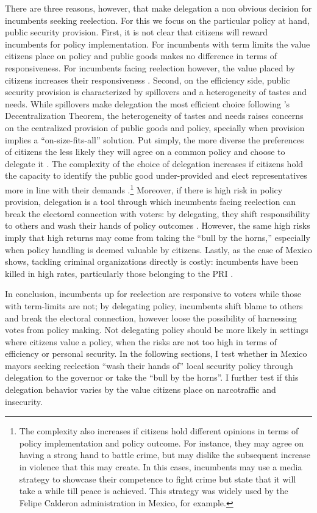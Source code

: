 \documentclass[12pt]{amsart}
\numberwithin{equation}{section}
\theoremstyle{definition}
\theoremstyle{definition}
\theoremstyle{definition}
\begin{document}
There are three reasons, however, that make delegation a non obvious decision for incumbents seeking reelection. For this we focus on the particular policy at hand, public security provision. First, it is not clear that citizens will reward incumbents for policy implementation. For incumbents with term limits the value citizens place on policy and public goods makes no difference in terms of responsiveness. For incumbents facing reelection however, the value placed by citizens increases their responsiveness \citep{lizzeri_2001, milner_2004}. Second, on the efficiency side, public security provision is characterized by spillovers and a heterogeneity of tastes and needs. While spillovers make delegation the most efficient choice following \citet{oates_1972}'s Decentralization Theorem, the heterogeneity of tastes and needs raises concerns on the centralized provision of public goods and policy, specially when provision implies a ``on-size-fits-all'' solution. Put simply, the more diverse the preferences of citizens the less likely they will agree on a common policy and choose to delegate it \citep{martin_2006, lyne_etal_2006}. The complexity of the choice of delegation increases if citizens hold the capacity to identify the public good under-provided and elect representatives more in line with their demands \citet{Besley_case_1995}.\footnote{The complexity also increases if citizens hold different opinions in terms of policy implementation and policy outcome. For instance, they may agree on having a strong hand to battle crime, but may dislike the subsequent increase in violence that this may create. In this cases, incumbents may use a media strategy to showcase their competence to fight crime but state that it will take a while till peace is achieved. This strategy was widely used by the Felipe Calderon administration in Mexico, for example.} Moreover, if there is high risk in policy provision, delegation is a tool through which incumbents facing reelection can break the electoral connection with voters: by delegating, they shift responsibility to others and wash their hands of policy outcomes \citep{fiorina_1982, loftis_2014}. However, the same high risks imply that high returns may come from taking the ``bull by the horns,'' especially when policy handling is deemed valuable by citizens. Lastly, as the case of Mexico shows, tackling criminal organizations directly is costly: incumbents have been killed in high rates, particularly those belonging to the PRI \citep{ley_trejo_2020}.  

In conclusion, incumbents up for reelection are responsive to voters while those with term-limits are not; by delegating policy, incumbents shift blame to others and break the electoral connection, however loose the possibility of harnessing votes from policy making. Not delegating policy should be more likely in settings where citizens value a policy, when the risks are not too high in terms of efficiency or personal security. In the following sections, I test whether in Mexico mayors seeking reelection  ``wash their hands of'' local security policy through delegation to the governor or take the ``bull by the horns''. I further test if this delegation behavior varies by the value citizens place on narcotraffic and insecurity. 
  
\end{document}
